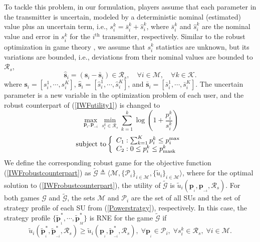 \documentclass[peerreview,onecolumn,11pt,draftclsnofoot]{IEEEtran}\usepackage{amsmath}\usepackage{amsfonts}\usepackage{epsfig}\usepackage{amssymb}\usepackage{graphicx}\usepackage{amssymb,amsmath}\usepackage{cite}\usepackage{color,soul}\newcommand\T{\rule{0pt}{3.1ex}}
\begin{document}
To tackle this problem, in our formulation, players assume that each parameter in the transmitter is uncertain, modeled by a deterministic nominal (estimated) value plus an uncertain term, i.e.,
$s^{k}_{i} = \bar{s}^{k}_{i}+\hat{s}^{k}_{i}$,
where $\bar{s}^{k}_{i}$ and $\hat{s}^{k}_{i}$ are the nominal
value and error in  $s^{k}_{i}$ for the $i^{\text{th}}$
transmitter, respectively. Similar to the robust optimization in game theory \cite{Robustgame}, we assume that $s^{k}_{i}$
statistics are unknown, but its variations are bounded, i.e., deviations from their nominal values are bounded to  $\mathcal{R}_{s}$,
 \begin{equation}
 \hat{\mathbf{s}}_{i}=(\mathbf{s}_{i}-\bar{\mathbf{s}}_{i}) \in \mathcal{R}_{s} , \quad
  \forall  i \in \mathcal{M},\quad \forall  k \in \mathcal{K}.
 \end{equation}
where $\mathbf{s}_{i}=[s_{i}^{1},\cdots,s_{i}^{K}]$, $\hat{\mathbf{s}}_{i}=[\hat{s}_{i}^{1},\cdots,\hat{s}_{i}^{K}]$, and $\bar{\mathbf{s}}_{i}=[\bar{s}_{i}^{1},\cdots,\bar{s}_{i}^{K}]$.
The uncertain parameter is a new variable in the optimization problem of each user, and the robust counterpart of (\ref{IWFutility1}) is changed \cite{selecectedrobust} to
\begin{equation}\label{IWFrobustcounterpart}
  \max_{\mathbf{p}_{i}, \mathbf{p}_{-i}} \min_{s^{k}_{i}\in \mathcal{R}_{s} }\sum_{k=1}^{k}\log(1+\frac{p^{k}_{i}}{s^{k}_{i}})
 \end{equation}
 \[\mathrm{subject~to} \left\{
\begin{array}{l l}
 C_1: \sum_{k=1}^{K} p^{k}_{i} \leq  p_{i}^{\scriptsize{\textnormal{max}}} \nonumber \\
 C_2: 0 \leq p^{k}_{i}\leq  p^{k}_{\scriptsize{\textnormal{mask}}} \nonumber \\
\end{array} \right. \]
We define the corresponding robust game for the objective function (\ref{IWFrobustcounterpart}) as $\widetilde{\mathcal{G}}
\triangleq \langle \mathcal{M},\{\mathcal{P}_{i}\}_{i \in \mathcal{M}}, \{\widetilde{u}_{i}\}_{i\in\mathcal{M}} \rangle$, where for the optimal solution to (\ref{IWFrobustcounterpart}), the utility of
$\widetilde{\mathcal{G}}$ is
$\widetilde{u}_{i}(\mathbf{p}_{_{i}},\mathbf{p}_{_{-i}},\mathcal{R}_{s})$.
For both games $\mathcal{G}$ and $\widetilde{\mathcal{G}}$, the sets $\mathcal{M}$ and $\mathcal{P}_{i}$ are the set of all SUs
and the set of strategy profile of each SU from
(\ref{Powerstratgy}), respectively. In this case, the strategy
profile $\{\widetilde{\mathbf{p}}^{*}_{_{1}},\cdots,\widetilde{\mathbf{p}}^{*}_{_{M}}\}$ is RNE for the game
$\widetilde{\mathcal{G}}$ if
\begin{equation}\label{NEpoint}
 \widetilde{u}_{i}(\widetilde{\mathbf{p}}^{*}_{_{i}},\widetilde{\mathbf{p}}^{*}_{_{-i}},\mathcal{R}_{s})\geq
 \widetilde{u}_{i}(\mathbf{p}_{_{i}},\widetilde{\mathbf{p}}^{*}_{_{-i}},\mathcal{R}_{s}),\; \forall \mathbf{p}_{_{i}} \in \mathcal{P}_{i}, \;\forall s^{k}_{i}\in \mathcal{R}_{s}, \; \forall i \in \mathcal{M}.
\end{equation}
\end{document}
